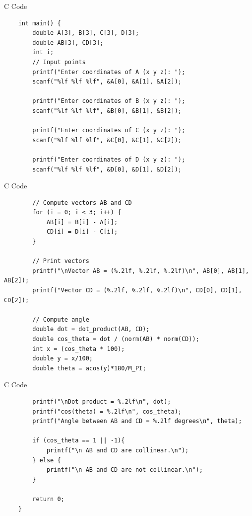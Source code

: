 \documentclass{beamer}
\begin{document}
\begin{frame}[fragile]{C Code}
    \begin{verbatim}
    int main() {
        double A[3], B[3], C[3], D[3];
        double AB[3], CD[3];
        int i;
        // Input points
        printf("Enter coordinates of A (x y z): ");
        scanf("%lf %lf %lf", &A[0], &A[1], &A[2]);
    
        printf("Enter coordinates of B (x y z): ");
        scanf("%lf %lf %lf", &B[0], &B[1], &B[2]);
    
        printf("Enter coordinates of C (x y z): ");
        scanf("%lf %lf %lf", &C[0], &C[1], &C[2]);
    
        printf("Enter coordinates of D (x y z): ");
        scanf("%lf %lf %lf", &D[0], &D[1], &D[2]);
    \end{verbatim}
\end{frame}

\begin{frame}[fragile]{C Code}
    \begin{verbatim}
        // Compute vectors AB and CD
        for (i = 0; i < 3; i++) {
            AB[i] = B[i] - A[i];
            CD[i] = D[i] - C[i];
        }
    
        // Print vectors
        printf("\nVector AB = (%.2lf, %.2lf, %.2lf)\n", AB[0], AB[1], AB[2]);
        printf("Vector CD = (%.2lf, %.2lf, %.2lf)\n", CD[0], CD[1], CD[2]);
    
        // Compute angle
        double dot = dot_product(AB, CD);
        double cos_theta = dot / (norm(AB) * norm(CD));
        int x = (cos_theta * 100);
        double y = x/100;
        double theta = acos(y)*180/M_PI;
    \end{verbatim}
\end{frame}

\begin{frame}[fragile]{C Code}
    \begin{verbatim}
        printf("\nDot product = %.2lf\n", dot);
        printf("cos(theta) = %.2lf\n", cos_theta);
        printf("Angle between AB and CD = %.2lf degrees\n", theta);
    
        if (cos_theta == 1 || -1){
            printf("\n AB and CD are collinear.\n");
        } else {
            printf("\n AB and CD are not collinear.\n");
        }
    
        return 0;
    }
    \end{verbatim}
\end{frame}
\end{document}
